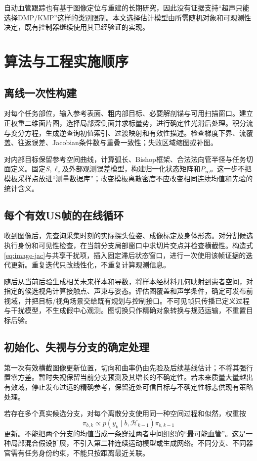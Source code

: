 \documentclass[UTF8,11pt,a4paper,fontset=fandol]{ctexart}
\numberwithin{equation}{section}
\theoremstyle{plain}
\theoremstyle{definition}
\theoremstyle{remark}
\begin{document}
自动血管跟踪也有基于图像定位与重建的长期研究\cite{Merouche2016}，因此没有证据支持“超声只能选择DMP/KMP”这样的类别限制。本文选择估计模型由所需随机对象和可观测性决定，既有控制器继续使用其已经验证的实现。

\section{算法与工程实施顺序}\label{sec:implementation}
\subsection{离线一次性构建}
对每个任务部位，输入参考表面、粗内部目标、必要解剖锚与可用扫描窗口。建立正权重二维面片图，选择局部深侧面并求标量势，进行确定性光滑后处理。积分流与变分方程，生成逆查询初值索引、过渡映射和有效性描述。检查梯度下界、流覆盖、往返误差、Jacobian条件数与重叠一致性；失败区域缩图或补图。

对内部目标保留参考空间曲线，计算弧长、Bishop框架、合法法向管半径与任务切面定义。固定$S,\ell_c$及外部观测误差模型，构建归一化状态矩阵和$P_\infty$。这一步不把模板采样点放进“测量数据库”；改变模板离散密度不应改变相同连续均值和先验的统计含义。

\subsection{每个有效US帧的在线循环}
收到图像后，先查询采集时刻的实际探头位姿、成像标定及身体形态。对分割候选执行身份和可见性检查，在当前分支局部窗口中求切片交点并检查横截性。构造式\eqref{eq:image-jac}与共享干扰项，插入固定滞后状态窗口，进行一次使用该帧证据的迭代更新。重复迭代只改线性化，不重复计算观测信息。

随后从当前后验生成相关未来样本和导数，将样本经材料几何映射到患者空间，对指定的候选视角计算接触点、声束与姿态。评估图覆盖和声学条件，确定可发布前视域，并把目标/视角场景交给既有规划与控制接口。不可见帧只传播已定义过程与干扰模型，不生成假中心观测。图切换只作精确对象转换与规范运输，不重置目标后验。

\subsection{初始化、失视与分支的确定处理}
第一次有效横截图像更新位置，切向和曲率仍由先验及后续基线估计；不将其强行置零方差。暂时失视保留当前分支预测及其增长的不确定性。若未来质量大量越出有效域，停止发布过远的精确参考，保留近处可信目标与不确定性标志供现有策略处理。

若存在多个真实候选分支，对每个离散分支使用同一种空间过程和似然，权重按
\begin{equation}
 \pi_{b,k}\propto p(y_k\mid b,\mathcal H_{k-1})\pi_{b,k-1}
 \label{eq:branch-weight}
\end{equation}
更新。不能把两个分支的均值当成一条穿过两者中间组织的“最可能血管”。这是一种局部混合假设扩展，不引入第二种连续运动模型或生成网络。不同分支、不同器官需有任务身份约束，不能只按距离最近关联。
\end{document}

